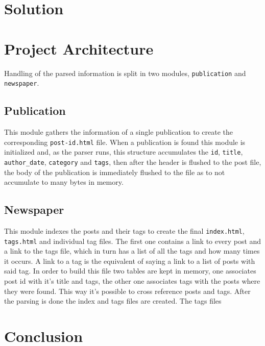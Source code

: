 \documentclass[a4paper]{article}
\begin{document}
\section{Solution}

\section{Project Architecture}

Handling of the parsed information is split in two modules, \texttt{publication} and \texttt{newspaper}.

\subsection{Publication}

This module gathers the information of a single publication to create the
corresponding \texttt{post-id.html} file. When a publication is found this
module is initialized and, as the parser runs, this structure accumulates the
\texttt{id}, \texttt{title}, \texttt{author\_date}, \texttt{category} and
\texttt{tags}, then after the header is flushed to the post file, the body of
the publication is immediately flushed to the file as to not accumulate to many
bytes in memory.

\subsection{Newspaper}

This module indexes the posts and their tags to create the final \texttt{index.html}, \texttt{tags.html} and individual tag files. The first one contains a link to every post and a link to the tags file, which in turn has a list of all the tags and how many times it occurs. A link to a tag is the equivalent of saying a link to a list of posts with said tag. In order to build this file two tables are kept in memory, one associates post id with it's title and tags, the other one associates tags with the posts where they were found. This way it's possible to cross reference posts and tags. After the parsing is done the index and tags files are created. The tags files

\section{Conclusion}
\end{document}
